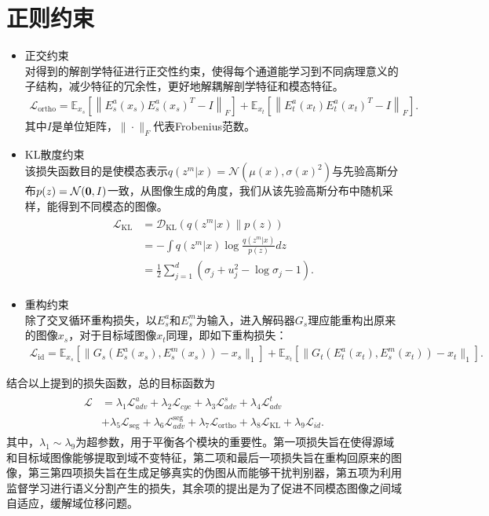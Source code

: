 \section{正则约束}
\begin{itemize}
    \item 正交约束\\对得到的解剖学特征进行正交性约束，使得每个通道能学习到不同病理意义的子结构，减少特征的冗余性，更好地解耦解剖学特征和模态特征。
    \begin{align}
        \mathcal{L}_{\text {ortho}}=\mathbb{E}_{x_s}\left[\left\|E^a_s(x_s) E^a_s(x_s)^T-I\right\|_{F}\right] + \mathbb{E}_{x_t}\left[\left\|E^a_t(x_t) E^a_t(x_t)^T-I\right\|_{F}\right].
    \end{align}
    其中$I$是单位矩阵，$\|\cdot \|_F$代表Frobenius范数。
    \item KL散度约束\\该损失函数目的是使模态表示$q(z^m|x)=\mathcal{N}(\mu(x), \sigma(x)^2)$与先验高斯分布$p(z)=\mathcal{N}(\bold{0},I)$一致，从图像生成的角度，我们从该先验高斯分布中随机采样，能得到不同模态的图像。
    \begin{align}
        \begin{aligned}\mathcal{L}_{\mathrm{KL}}&=\mathcal{D}_{\mathrm{KL}}(q(z^m|x)\|p(z))\\&=-\int{q(z^m|x)\log\frac{q(z^m|x)}{p(z)}dz}\\&=\frac{1}{2}\sum_{j=1}^d(\sigma_j+u_j^2-\log \sigma_j-1).\end{aligned}
    \end{align}
    \item 重构约束\\除了交叉循环重构损失，以$E_s^a$和$E_s^m$为输入，进入解码器$G_s$理应能重构出原来的图像$x_s$，对于目标域图像$x_t$同理，即如下重构损失：
    \begin{align}
        \mathcal{L}_{\mathrm{id}} = \mathbb{E}_{x_s}[\|G_s(E_s^a(x_s),E_s^m(x_s))-x_s\|_1] + \mathbb{E}_{x_t}[\|G_t(E_t^a(x_t),E_s^m(x_t))-x_t\|_1].
    \end{align}
\end{itemize}
结合以上提到的损失函数，总的目标函数为
\begin{align}
    \begin{aligned}
    \mathcal{L} &= \lambda_1\mathcal{L}_{adv}^a +\lambda_2\mathcal{L}_{cyc} +\lambda_3\mathcal{L}_{adv}^s +\lambda_4\mathcal{L}_{adv}^t \\
    &+\lambda_5\mathcal{L}_{\mathrm{seg}} +\lambda_6\mathcal{L}_{adv}^{\mathrm{seg}} +\lambda_7\mathcal{L}_{\mathrm{ortho}} +\lambda_8\mathcal{L}_{\mathcal{\mathrm{KL}}} + \lambda_9\mathcal{L}_{id}.
    \end{aligned}
    \label{eq:loss}
\end{align}
其中，$\lambda_1\sim \lambda_9$为超参数，用于平衡各个模块的重要性。第一项损失旨在使得源域和目标域图像能够提取到域不变特征，第二项和最后一项损失旨在重构回原来的图像，第三第四项损失旨在生成足够真实的伪图从而能够干扰判别器，第五项为利用监督学习进行语义分割产生的损失，其余项的提出是为了促进不同模态图像之间域自适应，缓解域位移问题。

